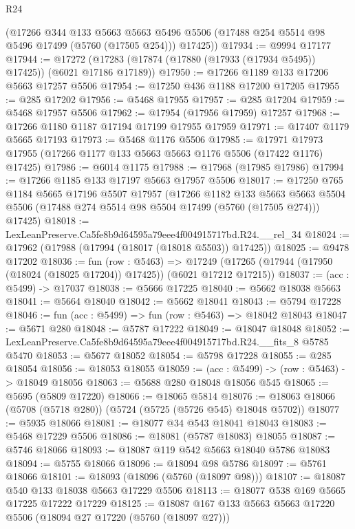 \begin{lexlean}{R24}
\begin{coremodule}
      (@17266
        @344
        @133
        @5663
        @5663
        @5496
        @5506
        (@17488 @254 @5514 @98 @5496 @17499 (@5760 (@17505 @254)))
        @17425))
@17934 := @9994 @17177
@17944 := @17272 (@17283 (@17874 (@17880 (@17933 (@17934 @5495)) @17425)) (@6021 @17186 @17189))
@17950 := @17266 @1189 @133 @17206 @5663 @17257 @5506
@17954 := @17250 @436 @1188 @17200 @17205
@17955 := @285 @17202
@17956 := @5468 @17955
@17957 := @285 @17204
@17959 := @5468 @17957 @5506
@17962 := @17954 (@17956 @17959) @17257
@17968 := @17266 @1180 @1187 @17194 @17199 @17955 @17959
@17971 := @17407 @1179 @5665 @17193
@17973 := @5468 @1176 @5506
@17985 := @17971 @17973 @17955 (@17266 @1177 @133 @5663 @5663 @1176 @5506 (@17422 @1176) @17425)
@17986 := @6014 @1175
@17988 := @17968 (@17985 @17986)
@17994 := @17266 @1185 @133 @17197 @5663 @17957 @5506
@18017 := @17250
    @765
    @1184
    @5665
    @17196
    @5507
    @17957
    (@17266
      @1182
      @133
      @5663
      @5663
      @5504
      @5506
      (@17488 @274 @5514 @98 @5504 @17499 (@5760 (@17505 @274)))
      @17425)
@18018 := LexLeanPreserve.Ca5fe8b9d64595a79eee4f004915717bd.R24.__rel_34
@18024 := @17962 (@17988 (@17994 (@18017 (@18018 @5503)) @17425))
@18025 := @9478 @17202
@18036 := fun (row : @5463) =>
  @17249 (@17265 (@17944 (@17950 (@18024 (@18025 @17204)) @17425)) (@6021 @17212 @17215))
@18037 := (acc : @5499) -> @17037
@18038 := @5666 @17225
@18040 := @5662 @18038 @5663
@18041 := @5664 @18040
@18042 := @5662 @18041
@18043 := @5794 @17228
@18046 := fun (acc : @5499) => fun (row : @5463) => @18042 @18043
@18047 := @5671 @280
@18048 := @5787 @17222
@18049 := @18047 @18048
@18052 := LexLeanPreserve.Ca5fe8b9d64595a79eee4f004915717bd.R24.__fits_8 @5785 @5470
@18053 := @5677 @18052
@18054 := @5798 @17228
@18055 := @285 @18054
@18056 := @18053 @18055
@18059 := (acc : @5499) -> (row : @5463) -> @18049 @18056
@18063 := @5688 @280 @18048 @18056 @545
@18065 := @5695 (@5809 @17220)
@18066 := @18065 @5814
@18076 := @18063 @18066 (@5708 (@5718 @280)) (@5724 (@5725 (@5726 @545) @18048 @5702))
@18077 := @5935 @18066
@18081 := @18077 @34 @543 @18041 @18043
@18083 := @5468 @17229 @5506
@18086 := @18081 (@5787 @18083) @18055
@18087 := @5746 @18066
@18093 := @18087 @119 @542 @5663 @18040 @5786 @18083
@18094 := @5755 @18066
@18096 := @18094 @98 @5786
@18097 := @5761 @18066
@18101 := @18093 (@18096 (@5760 (@18097 @98)))
@18107 := @18087 @540 @133 @18038 @5663 @17229 @5506
@18113 := @18077 @538 @169 @5665 @17225 @17222 @17229
@18125 := @18087 @167 @133 @5663 @5663 @17220 @5506 (@18094 @27 @17220 (@5760 (@18097 @27)))

\end{coremodule}
\end{lexlean}
